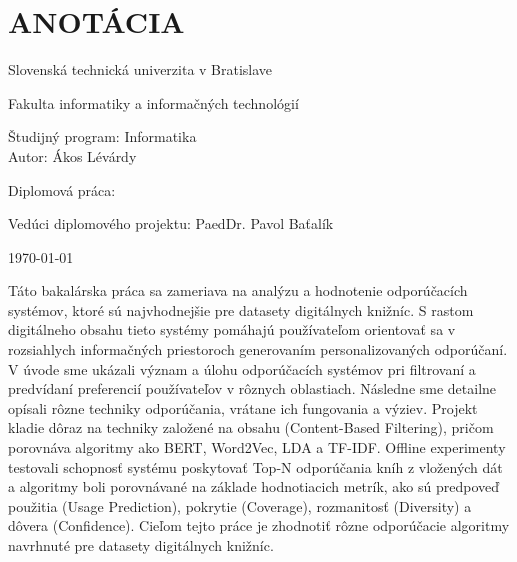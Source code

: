 \documentclass[\myFontSize,oneside,english,hidelinks,a4paper]{article}
\begin{document}
\newpage{}
\thispagestyle{empty}
\mbox{}

\newpage{}
\thispagestyle{empty}
\section*{ANOTÁCIA}
\begin{minipage}[t]{1\columnwidth}%
Slovenská technická univerzita v Bratislave

Fakulta informatiky a informačných technológií

Študijný program: Informatika\\

Autor: Ákos Lévárdy

Diplomová práca: \thesisTitle

Vedúci diplomového projektu: PaedDr. Pavol Baťalík

\today%
\end{minipage}
\bigskip{}

Táto bakalárska práca sa zameriava na analýzu a hodnotenie odporúčacích systémov, ktoré sú najvhodnejšie pre datasety digitálnych knižníc. S rastom digitálneho obsahu tieto systémy pomáhajú používateľom orientovať sa v rozsiahlych informačných priestoroch generovaním personalizovaných odporúčaní. V úvode sme ukázali význam a úlohu odporúčacích systémov pri filtrovaní a predvídaní preferencií používateľov v rôznych oblastiach. Následne sme detailne opísali rôzne techniky odporúčania, vrátane ich fungovania a výziev. Projekt kladie dôraz na techniky založené na obsahu (Content-Based Filtering), pričom porovnáva algoritmy ako BERT, Word2Vec, LDA a TF-IDF. Offline experimenty testovali schopnosť systému poskytovať Top-N odporúčania kníh z vložených dát a algoritmy boli porovnávané na základe hodnotiacich metrík, ako sú predpoveď použitia (Usage Prediction), pokrytie (Coverage), rozmanitosť (Diversity) a dôvera (Confidence). Cieľom tejto práce je zhodnotiť rôzne odporúčacie algoritmy navrhnuté pre datasety digitálnych knižníc.

\end{document}
